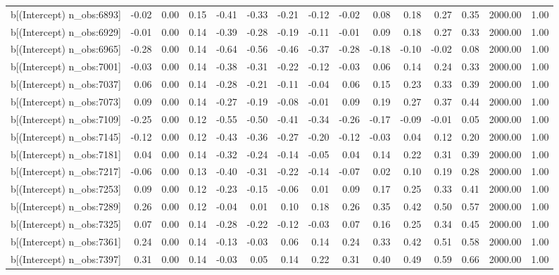 \begin{table}[ht]
\begin{tabular}{rrrrrrrrrrrrrrr}
  b[(Intercept) n\_obs:6893] & -0.02 & 0.00 & 0.15 & -0.41 & -0.33 & -0.21 & -0.12 & -0.02 & 0.08 & 0.18 & 0.27 & 0.35 & 2000.00 & 1.00 \\ 
  b[(Intercept) n\_obs:6929] & -0.01 & 0.00 & 0.14 & -0.39 & -0.28 & -0.19 & -0.11 & -0.01 & 0.09 & 0.18 & 0.27 & 0.33 & 2000.00 & 1.00 \\ 
  b[(Intercept) n\_obs:6965] & -0.28 & 0.00 & 0.14 & -0.64 & -0.56 & -0.46 & -0.37 & -0.28 & -0.18 & -0.10 & -0.02 & 0.08 & 2000.00 & 1.00 \\ 
  b[(Intercept) n\_obs:7001] & -0.03 & 0.00 & 0.14 & -0.38 & -0.31 & -0.22 & -0.12 & -0.03 & 0.06 & 0.14 & 0.24 & 0.33 & 2000.00 & 1.00 \\ 
  b[(Intercept) n\_obs:7037] & 0.06 & 0.00 & 0.14 & -0.28 & -0.21 & -0.11 & -0.04 & 0.06 & 0.15 & 0.23 & 0.33 & 0.39 & 2000.00 & 1.00 \\ 
  b[(Intercept) n\_obs:7073] & 0.09 & 0.00 & 0.14 & -0.27 & -0.19 & -0.08 & -0.01 & 0.09 & 0.19 & 0.27 & 0.37 & 0.44 & 2000.00 & 1.00 \\ 
  b[(Intercept) n\_obs:7109] & -0.25 & 0.00 & 0.12 & -0.55 & -0.50 & -0.41 & -0.34 & -0.26 & -0.17 & -0.09 & -0.01 & 0.05 & 2000.00 & 1.00 \\ 
  b[(Intercept) n\_obs:7145] & -0.12 & 0.00 & 0.12 & -0.43 & -0.36 & -0.27 & -0.20 & -0.12 & -0.03 & 0.04 & 0.12 & 0.20 & 2000.00 & 1.00 \\ 
  b[(Intercept) n\_obs:7181] & 0.04 & 0.00 & 0.14 & -0.32 & -0.24 & -0.14 & -0.05 & 0.04 & 0.14 & 0.22 & 0.31 & 0.39 & 2000.00 & 1.00 \\ 
  b[(Intercept) n\_obs:7217] & -0.06 & 0.00 & 0.13 & -0.40 & -0.31 & -0.22 & -0.14 & -0.07 & 0.02 & 0.10 & 0.19 & 0.28 & 2000.00 & 1.00 \\ 
  b[(Intercept) n\_obs:7253] & 0.09 & 0.00 & 0.12 & -0.23 & -0.15 & -0.06 & 0.01 & 0.09 & 0.17 & 0.25 & 0.33 & 0.41 & 2000.00 & 1.00 \\ 
  b[(Intercept) n\_obs:7289] & 0.26 & 0.00 & 0.12 & -0.04 & 0.01 & 0.10 & 0.18 & 0.26 & 0.35 & 0.42 & 0.50 & 0.57 & 2000.00 & 1.00 \\ 
  b[(Intercept) n\_obs:7325] & 0.07 & 0.00 & 0.14 & -0.28 & -0.22 & -0.12 & -0.03 & 0.07 & 0.16 & 0.25 & 0.34 & 0.45 & 2000.00 & 1.00 \\ 
  b[(Intercept) n\_obs:7361] & 0.24 & 0.00 & 0.14 & -0.13 & -0.03 & 0.06 & 0.14 & 0.24 & 0.33 & 0.42 & 0.51 & 0.58 & 2000.00 & 1.00 \\ 
  b[(Intercept) n\_obs:7397] & 0.31 & 0.00 & 0.14 & -0.03 & 0.05 & 0.14 & 0.22 & 0.31 & 0.40 & 0.49 & 0.59 & 0.66 & 2000.00 & 1.00 \\ 

\end{tabular}
\end{table}
